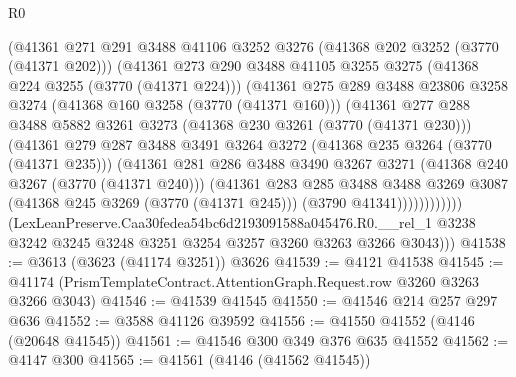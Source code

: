 \begin{lexlean}{R0}
\begin{coremodule}
                (@41361
                  @271
                  @291
                  @3488
                  @41106
                  @3252
                  @3276
                  (@41368 @202 @3252 (@3770 (@41371 @202)))
                  (@41361
                    @273
                    @290
                    @3488
                    @41105
                    @3255
                    @3275
                    (@41368 @224 @3255 (@3770 (@41371 @224)))
                    (@41361
                      @275
                      @289
                      @3488
                      @23806
                      @3258
                      @3274
                      (@41368 @160 @3258 (@3770 (@41371 @160)))
                      (@41361
                        @277
                        @288
                        @3488
                        @5882
                        @3261
                        @3273
                        (@41368 @230 @3261 (@3770 (@41371 @230)))
                        (@41361
                          @279
                          @287
                          @3488
                          @3491
                          @3264
                          @3272
                          (@41368 @235 @3264 (@3770 (@41371 @235)))
                          (@41361
                            @281
                            @286
                            @3488
                            @3490
                            @3267
                            @3271
                            (@41368 @240 @3267 (@3770 (@41371 @240)))
                            (@41361
                              @283
                              @285
                              @3488
                              @3488
                              @3269
                              @3087
                              (@41368 @245 @3269 (@3770 (@41371 @245)))
                              (@3790 @41341))))))))))))
        (LexLeanPreserve.Caa30fedea54bc6d2193091588a045476.R0.__rel_1
          @3238
          @3242
          @3245
          @3248
          @3251
          @3254
          @3257
          @3260
          @3263
          @3266
          @3043)))
@41538 := @3613 (@3623 (@41174 @3251)) @3626
@41539 := @4121 @41538
@41545 := @41174 (PrismTemplateContract.AttentionGraph.Request.row @3260 @3263 @3266 @3043)
@41546 := @41539 @41545
@41550 := @41546 @214 @257 @297 @636
@41552 := @3588 @41126 @39592
@41556 := @41550 @41552 (@4146 (@20648 @41545))
@41561 := @41546 @300 @349 @376 @635 @41552
@41562 := @4147 @300
@41565 := @41561 (@4146 (@41562 @41545))

\end{coremodule}
\end{lexlean}
